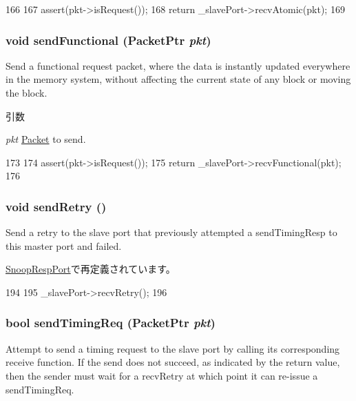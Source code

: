 \begin{DoxyCode}
166 {
167     assert(pkt->isRequest());
168     return _slavePort->recvAtomic(pkt);
169 }
\end{DoxyCode}
\hypertarget{classMasterPort_aef8a57d30c0da6a2d2a599a14a9b8751}{
\subsubsection[{sendFunctional}]{\setlength{\rightskip}{0pt plus 5cm}void sendFunctional ({\bf PacketPtr} {\em pkt})}}
\label{classMasterPort_aef8a57d30c0da6a2d2a599a14a9b8751}
Send a functional request packet, where the data is instantly updated everywhere in the memory system, without affecting the current state of any block or moving the block.


\begin{DoxyParams}{引数}
\item[{\em pkt}]\hyperlink{classPacket}{Packet} to send. \end{DoxyParams}



\begin{DoxyCode}
173 {
174     assert(pkt->isRequest());
175     return _slavePort->recvFunctional(pkt);
176 }
\end{DoxyCode}
\hypertarget{classMasterPort_a6172657b944e32a722d90a20c5896bb7}{
\subsubsection[{sendRetry}]{\setlength{\rightskip}{0pt plus 5cm}void sendRetry ()}}
\label{classMasterPort_a6172657b944e32a722d90a20c5896bb7}
Send a retry to the slave port that previously attempted a sendTimingResp to this master port and failed. 

\hyperlink{classCoherentBus_1_1SnoopRespPort_a6172657b944e32a722d90a20c5896bb7}{SnoopRespPort}で再定義されています。


\begin{DoxyCode}
194 {
195     _slavePort->recvRetry();
196 }
\end{DoxyCode}
\hypertarget{classMasterPort_aafaf979005392447714384794f1a8610}{
\subsubsection[{sendTimingReq}]{\setlength{\rightskip}{0pt plus 5cm}bool sendTimingReq ({\bf PacketPtr} {\em pkt})}}
\label{classMasterPort_aafaf979005392447714384794f1a8610}
Attempt to send a timing request to the slave port by calling its corresponding receive function. If the send does not succeed, as indicated by the return value, then the sender must wait for a recvRetry at which point it can re-\/issue a sendTimingReq.


